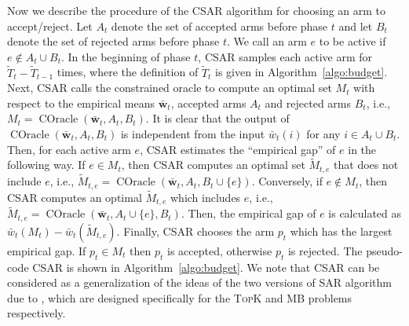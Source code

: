 \documentclass{article}
\newcommand{\AlgorithmBud}{{\small \textsf{CSAR}}\xspace}
\DeclareMathOperator{\COracle}{COracle}
\newcommand{\MultiIdent}{\textsc{TopK}\xspace}
\newcommand{\MultiBandit}{\textsc{MB}\xspace}
\renewcommand{\vec}[1]{\boldsymbol{#1}}
\begin{document}
Now we describe the procedure of the \AlgorithmBud algorithm for choosing an arm to accept/reject.
Let $A_t$ denote the set of accepted arms before phase $t$ and let $B_t$ denote the set of rejected arms before phase $t$.
We call an arm $e$ to be active if $e\not\in A_t\cup B_t$.
In the beginning of phase $t$, \AlgorithmBud samples each active arm for $\tilde T_t -\tilde T_{t-1}$ times, where the definition of $\tilde T_t$ is given in Algorithm~\ref{algo:budget}.
Next, \AlgorithmBud calls the constrained oracle to compute an optimal set $M_t$ with respect to the empirical means $\vec {\bar w}_t$, accepted arms $A_t$ and rejected arms $B_t$, i.e., $M_t = \COracle(\vec {\bar w}_t, A_t,B_t)$.
It is clear that the output of $\COracle(\vec {\bar w}_t, A_t,B_t)$ is independent from the input $\bar w_t(i)$ for any $i\in A_t\cup B_t$.
Then, for each active arm $e$, \AlgorithmBud estimates the ``empirical gap'' of $e$ in the following way.
If $e\in M_t$, then \AlgorithmBud computes an optimal set $\tilde M_{t,e}$ that does not include $e$, i.e., $\tilde M_{t,e} = \COracle(\vec {\bar w}_t, A_t, B_t \cup \{e\})$.
Conversely, if $e\not\in M_t$, then \AlgorithmBud computes an optimal $\tilde M_{t,e}$ which includes $e$, i.e., $\tilde M_{t,e} = \COracle(\vec {\bar w}_t, A_t \cup \{e\}, B_t)$.
Then, the empirical gap of $e$ is calculated as $\bar w_t(M_t)-\bar w_t(\tilde M_{t,e})$.
Finally, \AlgorithmBud chooses the  arm $p_t$ which has the largest empirical gap.
If $p_t\in M_t$ then $p_t$ is accepted, otherwise $p_t$ is rejected.
The pseudo-code \AlgorithmBud is shown in Algorithm~\ref{algo:budget}.
We note that \AlgorithmBud can be considered as a generalization of the ideas of the two versions of SAR algorithm due to \citet{bubeck2013multiple}, which are designed specifically for the \MultiIdent and \MultiBandit problems respectively.
\end{document}

